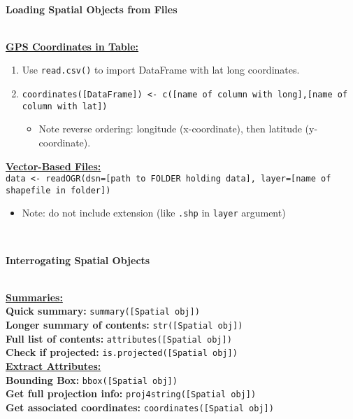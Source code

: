 \documentclass[10pt]{article}
\begin{document}

\hrulefill \\ 
\centerline{\textbf{Loading Spatial Objects from Files}} \\
\underline{\textbf{GPS Coordinates in Table:}}\\
\begin{enumerate}
	\item Use \texttt{read.csv()} to import DataFrame with lat long coordinates.
	\item \texttt{coordinates([DataFrame]) <- c([name of column with long],[name of column with lat])}
	\begin{itemize}
		\item Note reverse ordering: longitude (x-coordinate), then latitude (y-coordinate).
	\end{itemize}
\end{enumerate}
\underline{\textbf{Vector-Based Files:}}\\
\texttt{data <- readOGR(dsn=[path to FOLDER holding data], layer=[name of shapefile in folder])}
\begin{itemize}
	\item Note: do not include extension (like \texttt{.shp} in \texttt{layer} argument)
\end{itemize}


\hrulefill \\ 
\centerline{\textbf{Interrogating Spatial Objects}} \\
\underline{\textbf{Summaries:} }\\
\textbf{Quick summary:} \texttt{summary([Spatial obj])}\\
\textbf{Longer summary of contents:} \texttt{str([Spatial obj])}\\
\textbf{Full list of contents:} \texttt{attributes([Spatial obj])}\\
\textbf{Check if projected:} \texttt{is.projected([Spatial obj])}\\

\underline{\textbf{Extract Attributes:} }\\
\textbf{Bounding Box:} \texttt{bbox([Spatial obj])}\\
\textbf{Get full projection info:} \texttt{proj4string([Spatial obj])}\\
\textbf{Get associated coordinates:} \texttt{coordinates([Spatial obj])}\\
\end{document}
